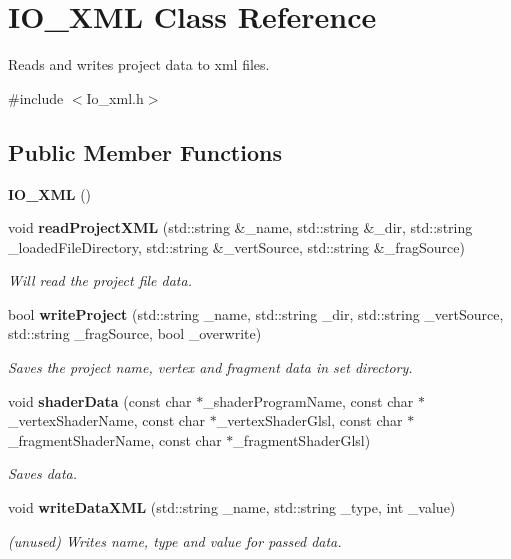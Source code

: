 \section{I\-O\-\_\-\-X\-M\-L Class Reference}
\label{class_i_o___x_m_l}


Reads and writes project data to xml files.  




{\ttfamily \#include $<$Io\-\_\-xml.\-h$>$}

\subsection*{Public Member Functions}
\begin{DoxyCompactItemize}
\item 
{\bf I\-O\-\_\-\-X\-M\-L} ()
\item 
void {\bf read\-Project\-X\-M\-L} (std\-::string \&\-\_\-name, std\-::string \&\-\_\-dir, std\-::string \-\_\-loaded\-File\-Directory, std\-::string \&\-\_\-vert\-Source, std\-::string \&\-\_\-frag\-Source)
\begin{DoxyCompactList}\small\item\em Will read the project file data. \end{DoxyCompactList}\item 
bool {\bf write\-Project} (std\-::string \-\_\-name, std\-::string \-\_\-dir, std\-::string \-\_\-vert\-Source, std\-::string \-\_\-frag\-Source, bool \-\_\-overwrite)
\begin{DoxyCompactList}\small\item\em Saves the project name, vertex and fragment data in set directory. \end{DoxyCompactList}\item 
void {\bf shader\-Data} (const char $\ast$\-\_\-shader\-Program\-Name, const char $\ast$\-\_\-vertex\-Shader\-Name, const char $\ast$\-\_\-vertex\-Shader\-Glsl, const char $\ast$\-\_\-fragment\-Shader\-Name, const char $\ast$\-\_\-fragment\-Shader\-Glsl)
\begin{DoxyCompactList}\small\item\em Saves data. \end{DoxyCompactList}\item 
void {\bf write\-Data\-X\-M\-L} (std\-::string \-\_\-name, std\-::string \-\_\-type, int \-\_\-value)
\begin{DoxyCompactList}\small\item\em (unused) Writes name, type and value for passed data. \end{DoxyCompactList}\end{DoxyCompactItemize}
